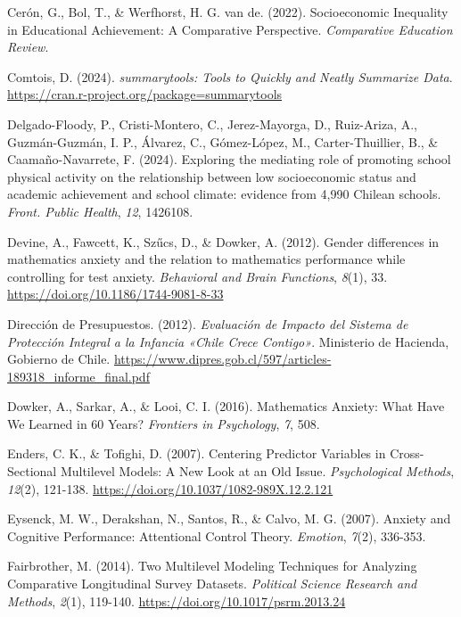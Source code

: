 \documentclass[
  spanish,
  a4paper,
  oneside]{scrbook}
\newlength{\cslhangindent}
\newenvironment{CSLReferences}[2] %
 {\begin{list}{}{%
  \setlength{\itemindent}{0pt}
  \setlength{\leftmargin}{0pt}
  \setlength{\parsep}{0pt}
  \ifodd #1
   \setlength{\leftmargin}{\cslhangindent}
   \setlength{\itemindent}{-1\cslhangindent}
  \fi
  \setlength{\itemsep}{#2\baselineskip}}}
 {\end{list}}
\begin{document}
\begin{CSLReferences}{1}{0}
Cerón, G., Bol, T., \& Werfhorst, H. G. van de. (2022). Socioeconomic
Inequality in Educational Achievement: A Comparative Perspective.
\emph{Comparative Education Review}.

Comtois, D. (2024). \emph{summarytools: Tools to Quickly and Neatly
Summarize Data}. \url{https://cran.r-project.org/package=summarytools}

Delgado-Floody, P., Cristi-Montero, C., Jerez-Mayorga, D., Ruiz-Ariza,
A., Guzmán-Guzmán, I. P., Álvarez, C., Gómez-López, M.,
Carter-Thuillier, B., \& Caamaño-Navarrete, F. (2024). Exploring the
mediating role of promoting school physical activity on the relationship
between low socioeconomic status and academic achievement and school
climate: evidence from 4,990 Chilean schools. \emph{Front. Public
Health}, \emph{12}, 1426108.

Devine, A., Fawcett, K., Szűcs, D., \& Dowker, A. (2012). Gender
differences in mathematics anxiety and the relation to mathematics
performance while controlling for test anxiety. \emph{Behavioral and
Brain Functions}, \emph{8}(1), 33.
\url{https://doi.org/10.1186/1744-9081-8-33}

Dirección de Presupuestos. (2012). \emph{Evaluación de Impacto del
Sistema de Protección Integral a la Infancia {«Chile Crece Contigo»}}.
Ministerio de Hacienda, Gobierno de Chile.
\url{https://www.dipres.gob.cl/597/articles-189318_informe_final.pdf}

Dowker, A., Sarkar, A., \& Looi, C. I. (2016). Mathematics Anxiety: What
Have We Learned in 60 Years? \emph{Frontiers in Psychology}, \emph{7},
508.

Enders, C. K., \& Tofighi, D. (2007). Centering Predictor Variables in
Cross-Sectional Multilevel Models: A New Look at an Old Issue.
\emph{Psychological Methods}, \emph{12}(2), 121-138.
\url{https://doi.org/10.1037/1082-989X.12.2.121}

Eysenck, M. W., Derakshan, N., Santos, R., \& Calvo, M. G. (2007).
Anxiety and Cognitive Performance: Attentional Control Theory.
\emph{Emotion}, \emph{7}(2), 336-353.

Fairbrother, M. (2014). Two Multilevel Modeling Techniques for Analyzing
Comparative Longitudinal Survey Datasets. \emph{Political Science
Research and Methods}, \emph{2}(1), 119-140.
\url{https://doi.org/10.1017/psrm.2013.24}


\end{CSLReferences}
\end{document}

